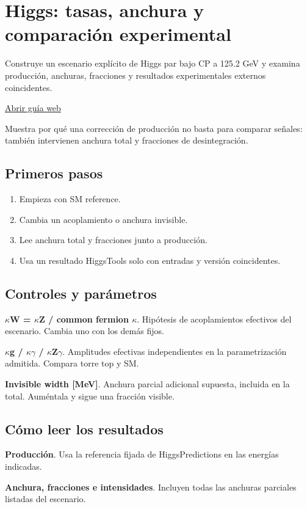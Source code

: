 \documentclass[11pt,a4paper]{article}
\begin{document}
\section{Higgs: tasas, anchura y comparación experimental}
Construye un escenario explícito de Higgs par bajo CP a 125.2 GeV y examina producción, anchuras, fracciones y resultados experimentales externos coincidentes.

\href{https://karlesmarin.github.io/ghu-explorer/guide/es/higgstools/index.html}{Abrir guía web}

Muestra por qué una corrección de producción no basta para comparar señales: también intervienen anchura total y fracciones de desintegración.
\subsection*{Primeros pasos}
\begin{enumerate}
\item Empieza con SM reference.
\item Cambia un acoplamiento o anchura invisible.
\item Lee anchura total y fracciones junto a producción.
\item Usa un resultado HiggsTools solo con entradas y versión coincidentes.
\end{enumerate}
\subsection*{Controles y parámetros}
\textbf{\ensuremath{\kappa}W = \ensuremath{\kappa}Z / common fermion \ensuremath{\kappa}}. Hipótesis de acoplamientos efectivos del escenario. Cambia uno con los demás fijos.

\textbf{\ensuremath{\kappa}g / \ensuremath{\kappa}\ensuremath{\gamma} / \ensuremath{\kappa}Z\ensuremath{\gamma}}. Amplitudes efectivas independientes en la parametrización admitida. Compara torre top y SM.

\textbf{Invisible width [MeV]}. Anchura parcial adicional supuesta, incluida en la total. Auméntala y sigue una fracción visible.

\subsection*{Cómo leer los resultados}
\textbf{Producción}. Usa la referencia fijada de HiggsPredictions en las energías indicadas.

\textbf{Anchura, fracciones e intensidades}. Incluyen todas las anchuras parciales listadas del escenario.
\end{document}
